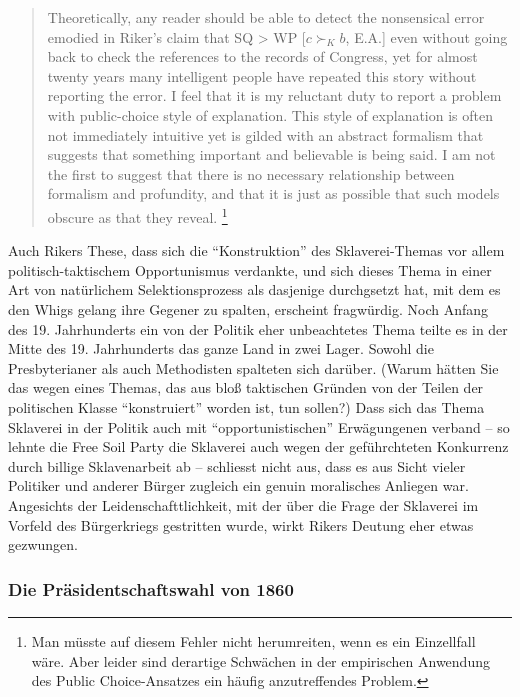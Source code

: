 \begin{quotation}
Theoretically, any reader should be able to detect the nonsensical error
emodied in Riker's claim that SQ > WP [$c \succ_K b$, E.A.] even without going
back to check the references to the records of Congress, yet for almost twenty
years many intelligent people have repeated this story without reporting the
error. I feel that it is my reluctant duty to report a problem with
public-choice style of explanation. This style of explanation is often not
immediately intuitive yet is gilded with an abstract formalism that suggests
that something important and believable is being said. I am not the first to
suggest that there is no necessary relationship between formalism and
profundity, and that it is just as possible that such models obscure as that
they reveal. \cite[S. 246]{mackie:2003}\footnote{Man müsste auf diesem Fehler
nicht herumreiten, wenn es ein Einzellfall wäre. Aber leider sind derartige
Schwächen in der empirischen Anwendung des Public Choice-Ansatzes ein häufig
anzutreffendes Problem.}
\end{quotation}

Auch Rikers These, dass sich die ``Konstruktion'' des Sklaverei-Themas vor allem
politisch-taktischem Opportunismus verdankte, und sich dieses Thema in einer Art
von natürlichem Selektionsprozess als dasjenige durchgsetzt hat, mit dem es den
Whigs gelang ihre Gegener zu spalten, erscheint fragwürdig. Noch Anfang des 19.
Jahrhunderts ein von der Politik eher unbeachtetes Thema teilte es in der Mitte
des 19. Jahrhunderts das ganze Land in zwei Lager. Sowohl die Presbyterianer als
auch Methodisten spalteten sich darüber. (Warum hätten Sie das wegen eines
Themas, das aus bloß taktischen Gründen von der Teilen der politischen Klasse
``konstruiert'' worden ist, tun sollen?) Dass sich das Thema Sklaverei in der
Politik auch mit ``opportunistischen'' Erwägungenen verband -- so lehnte die Free
Soil Party die Sklaverei auch wegen der geführchteten Konkurrenz durch billige
Sklavenarbeit ab -- schliesst nicht aus, dass es aus Sicht vieler Politiker und
anderer Bürger zugleich ein genuin moralisches Anliegen war. Angesichts der
Leidenschafttlichkeit, mit der über die Frage der Sklaverei im Vorfeld des
Bürgerkriegs gestritten wurde, wirkt Rikers Deutung eher etwas gezwungen.

\subsubsection{Die Präsidentschaftswahl von 1860}

